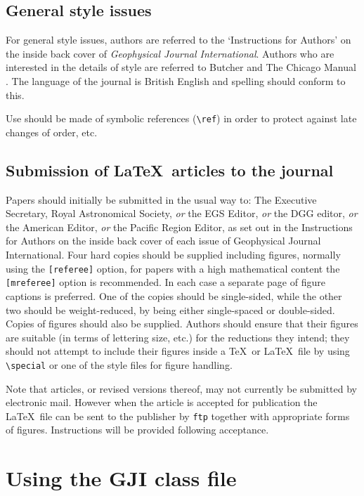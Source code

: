 \documentclass{gji}
\begin{document}
\subsection{General style issues}

For general style issues, authors are referred to the `Instructions for
Authors' on the inside back cover of \textit{Geophysical Journal
International}. Authors
who are interested in the details of style are referred to Butcher
 and The Chicago Manual . The language of
the journal is British English and spelling should conform to this.

Use should be made of symbolic references (\verb"\ref") in order to
protect against late changes of order, etc.

\subsection{Submission of \LaTeX\ articles to the journal}

Papers should initially be submitted in the usual way to:
The Executive Secretary, Royal Astronomical Society, {\em or\/}
the EGS Editor,  {\em or\/} the DGG editor,  {\em or\/}
the American Editor,  {\em or\/} the Pacific Region Editor,
as set out in the Instructions for Authors on the inside back cover of
each issue of Geophysical Journal International.
Four hard copies should be supplied including figures, normally using the
\verb"[referee]" option, for papers with a  high mathematical content the
\verb"[mreferee]" option is recommended. In each case a separate page of
figure captions is preferred.
One of the copies should  be single-sided,
while the other two should  be weight-reduced, by being either
single-spaced or double-sided.   Copies of figures should
also be supplied. Authors should  ensure that their figures are suitable
(in terms of lettering size, etc.)  for the reductions they intend; they
should not attempt to include their figures inside a \TeX\ or \LaTeX\
file by using \verb"\special" or one of the style files for figure
handling.

Note that articles, or revised versions thereof, may not currently be
submitted by electronic mail. However when the article is accepted for
publication the \LaTeX\ file can be sent to the publisher by \verb"ftp"
together with appropriate forms of figures.  Instructions will be provided
following acceptance.

\section{Using the GJI class file}
\end{document}

